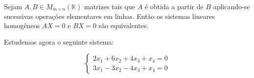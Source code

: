 \begin{corollary}
    Sejam $A, B \in M_{m \times n}(\mathbb K)$ matrizes tais que $A$ é obtida a partir de $B$ aplicando-se sucessivas operações elementares em linhas.
    Então os sistemas lineares homogêneos $AX=0$ e $BX=0$ são equivalentes.
\end{corollary}

Estudemos agora o seguinte sistema:

\begin{equation}\label{eqn:sistemaExemplo1}
    \begin{cases}
        2x_1 + 6x_2 + 4x_3 + x_4 = 0 \\
        3x_1 - 3x_2 - 4x_3 + x_4 = 0
    \end{cases}
\end{equation}

